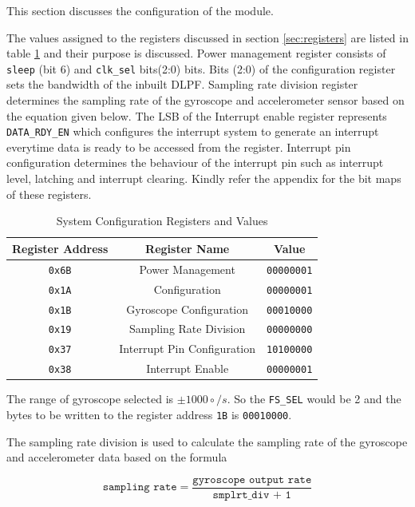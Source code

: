 \documentclass{article}
\begin{document}
	This section discusses the configuration of the module.
	
	The values assigned to the registers discussed in section \ref{sec:registers} are listed in table \ref{tab:sys_config_table} and their purpose is discussed. Power management register consists of \texttt{sleep} (bit 6) and \texttt{clk\_sel} bits(2:0) bits. Bits (2:0) of the configuration register sets the bandwidth of the inbuilt DLPF. Sampling rate division register determines the sampling rate of the gyroscope and accelerometer sensor based on the equation given below. The LSB of the Interrupt enable register represents \texttt{DATA\_RDY\_EN} which configures the interrupt system to generate an interrupt everytime data is ready to be accessed from the register. Interrupt pin configuration determines the behaviour of the interrupt pin such as interrupt level, latching and interrupt clearing. Kindly refer the appendix for the bit maps of these registers.
	
	\begin{table}[h]
		\centering
		\begin{tabular}{|c|c|c|} %
			\hline
			Register Address & Register Name & Value \\ %
			\hline
			\texttt{0x6B} & Power Management & \texttt{00000001}\\ 
			\hline
			\texttt{0x1A} & Configuration & \texttt{00000001}\\ 
			\hline
			\texttt{0x1B} & Gyroscope Configuration & \texttt{00010000}\\ 
			\hline
			\texttt{0x19} & Sampling Rate Division & \texttt{00000000}\\ 
			\hline
			\texttt{0x37} & Interrupt Pin Configuration & \texttt{10100000}\\ 
			\hline
			\texttt{0x38} & Interrupt Enable & \texttt{00000001}\\ 
			\hline
		\end{tabular}
		\caption{System Configuration Registers and Values}
		\label{tab:sys_config_table}
	\end{table}

	The range of gyroscope selected is $\pm 1000 \circ/s$. So the \texttt{FS\_SEL} would be 2 and the bytes to be written to the register address \texttt{1B} is \texttt{00010000}.
	
	The sampling rate division is used to calculate the sampling rate of the gyroscope and accelerometer data based on the formula
	
	$$ \texttt{sampling rate} = \frac{\texttt{gyroscope output rate}}{\texttt{smplrt\_div + 1}}$$
	
\end{document}
